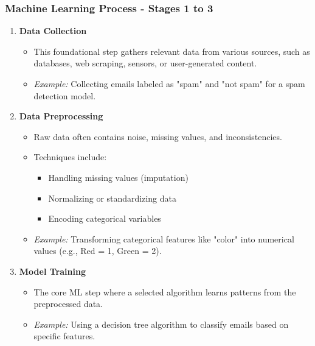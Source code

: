\documentclass[aspectratio=169]{beamer}
\begin{document}
\begin{frame}[fragile]
  \frametitle{Machine Learning Process - Stages 1 to 3}
  \begin{enumerate}
    \item \textbf{Data Collection}
      \begin{itemize}
        \item This foundational step gathers relevant data from various sources, such as databases, web scraping, sensors, or user-generated content.
        \item \textit{Example:} Collecting emails labeled as "spam" and "not spam" for a spam detection model.
      \end{itemize}
      
    \item \textbf{Data Preprocessing}
      \begin{itemize}
        \item Raw data often contains noise, missing values, and inconsistencies.
        \item Techniques include:
          \begin{itemize}
            \item Handling missing values (imputation)
            \item Normalizing or standardizing data
            \item Encoding categorical variables
          \end{itemize}
        \item \textit{Example:} Transforming categorical features like "color" into numerical values (e.g., Red = 1, Green = 2).
      \end{itemize}
    
    \item \textbf{Model Training}
      \begin{itemize}
        \item The core ML step where a selected algorithm learns patterns from the preprocessed data.
        \item \textit{Example:} Using a decision tree algorithm to classify emails based on specific features.
      \end{itemize}
  \end{enumerate}
\end{frame}
\end{document}
